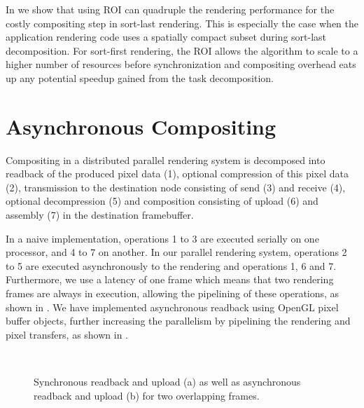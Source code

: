 In \cite{EBAHMP:12} we show that using ROI can quadruple the rendering
performance for the costly compositing step in sort-last rendering. This is
especially the case when the application rendering code uses a spatially
compact subset during sort-last decomposition. For sort-first rendering, the
ROI allows the algorithm to scale to a higher number of resources before
synchronization and compositing overhead eats up any potential speedup gained
from the task decomposition.

\section{Asynchronous Compositing}

Compositing in a distributed parallel rendering system is decomposed into
readback of the produced pixel data (1), optional compression of this pixel data
(2), transmission to the destination node consisting of send (3) and receive
(4), optional decompression (5) and composition consisting of upload (6) and
assembly (7) in the destination framebuffer.

In a naive implementation, operations 1 to 3 are executed serially on one
processor, and 4 to 7 on another. In our parallel rendering system, operations 2
to 5 are executed asynchronously to the rendering and operations 1, 6 and 7.
Furthermore, we use a latency of one frame which means that two rendering frames
are always in execution, allowing the pipelining of these operations, as shown
in . We have implemented asynchronous readback using OpenGL pixel
buffer objects, further increasing the parallelism by pipelining the rendering
and pixel transfers, as shown in .

\begin{figure}[ht]\center
  \\
  \caption{Synchronous readback and upload (a) as well as
    asynchronous readback and upload (b) for two overlapping frames.}
\end{figure}

